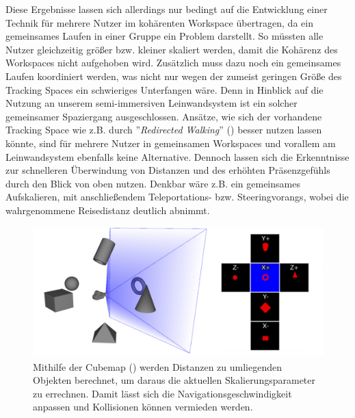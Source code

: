 Diese Ergebnisse lassen sich allerdings nur bedingt auf die Entwicklung einer Technik für mehrere Nutzer im kohärenten Workspace übertragen, da ein gemeinsames Laufen in einer Gruppe ein Problem darstellt. So müssten alle Nutzer gleichzeitig größer bzw. kleiner skaliert werden, damit die Kohärenz des Workspaces nicht aufgehoben wird. Zusätzlich muss dazu noch ein gemeinsames Laufen koordiniert werden, was nicht nur wegen der zumeist geringen Größe des Tracking Spaces ein schwieriges Unterfangen wäre. Denn in Hinblick auf die Nutzung an unserem semi-immersiven Leinwandsystem ist ein solcher gemeinsamer Spaziergang ausgeschlossen. Ansätze, wie sich der vorhandene Tracking Space wie z.B. durch ”\textit{Redirected Walking}” (\cite{RazzaqueRedirectedWalking}) besser nutzen lassen könnte, sind für mehrere Nutzer in gemeinsamen Workspaces und vorallem am Leinwandsystem ebenfalls keine Alternative. 
Dennoch lassen sich die Erkenntnisse zur schnelleren Überwindung von Distanzen und des erhöhten Präsenzgefühls durch den Blick von oben nutzen. Denkbar wäre z.B. ein gemeinsames Aufskalieren, mit anschließendem Teleportations- bzw. Steeringvorangs, wobei die wahrgenommene Reisedistanz deutlich abnimmt.


\begin{figure}[h]
  \centering
  \includegraphics[width=\textwidth]{images/cubemap2.png}
  \caption{Mithilfe der Cubemap (\cite{McCrae2009MultiscaleNavigationb}) werden Distanzen zu umliegenden Objekten berechnet, um daraus die aktuellen Skalierungsparameter zu errechnen. Damit lässt sich die Navigationsgeschwindigkeit anpassen und Kollisionen können vermieden werden.}
  \label{fig:todo}
\end{figure}

